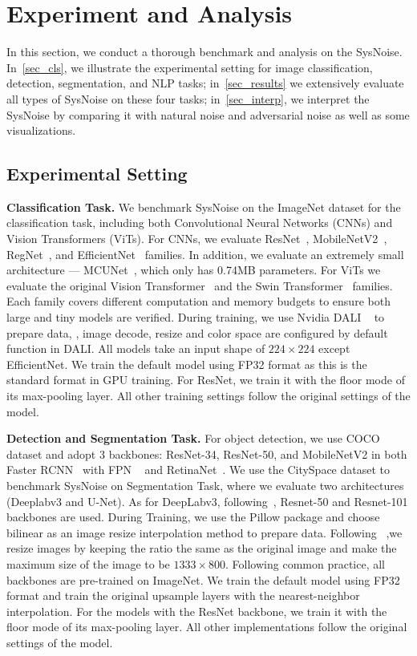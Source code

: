 \section{Experiment and Analysis}

In this section, we conduct a thorough benchmark and analysis on the SysNoise.
In~\autoref{sec_cls}, we illustrate the experimental setting for image classification, detection, segmentation, and NLP tasks; in~\autoref{sec_results} we extensively evaluate all types of SysNoise on these four tasks; in~\autoref{sec_interp}, we interpret the SysNoise by comparing it with natural noise and adversarial noise as well as some visualizations. 

\subsection{Experimental Setting}
\textbf{Classification Task.}
\label{sec_cls}
We benchmark SysNoise on the ImageNet dataset for the classification task, including both Convolutional Neural Networks (CNNs) and Vision Transformers (ViTs). 
For CNNs, we evaluate ResNet~\cite{he2016deep}, MobileNetV2~\cite{sandler2018mobilenetv2}, RegNet~\cite{radosavovic2020designing}, and EfficientNet~\cite{tan2020efficientnet} families. 
In addition, we evaluate an extremely small architecture — MCUNet~\cite{lin2020mcunet}, which only has 0.74MB parameters. 
For ViTs we evaluate the original Vision Transformer~\cite{dosovitskiy2020vit} and the Swin Transformer~\cite{liu2021Swin} families.
Each family covers different computation and memory budgets to ensure both large and tiny models are verified. During training, we use Nvidia DALI ~\cite{dali} to prepare data, \ie, image decode, resize and color space are configured by default function in DALI. All models take an input shape of $224\times224$ except EfficientNet. We train the default model using FP32 format as this is the standard format in GPU training. For ResNet, we train it with the floor mode of its max-pooling layer. All other training settings follow the original settings of the model.

\textbf{Detection and Segmentation Task.}
\label{sec_detseg}
For object detection, we use COCO dataset and adopt 3 backbones: ResNet-34, ResNet-50, and MobileNetV2 in both Faster RCNN~\cite{ren2015faster} with FPN ~\cite{faster-fpn} and RetinaNet~\cite{lin2017focal}.
We use the CitySpace dataset to benchmark SysNoise on Segmentation Task, where we evaluate two architectures (Deeplabv3 and U-Net). As for DeepLabv3, following~\cite{deeplabv32018}, Resnet-50 and Resnet-101 backbones are used. During Training, we use the Pillow package and choose bilinear as an image resize interpolation method to prepare data. Following~\cite{faster-fpn} ,we resize images by keeping the ratio the same as the original image and make the maximum size of the image to be $1333\times800$. Following common practice, all backbones are pre-trained on ImageNet. We train the default model using FP32 format and train the original upsample layers with the nearest-neighbor interpolation. For the models with the ResNet backbone, we train it with the floor mode of its max-pooling layer. All other implementations follow the original settings of the model.

